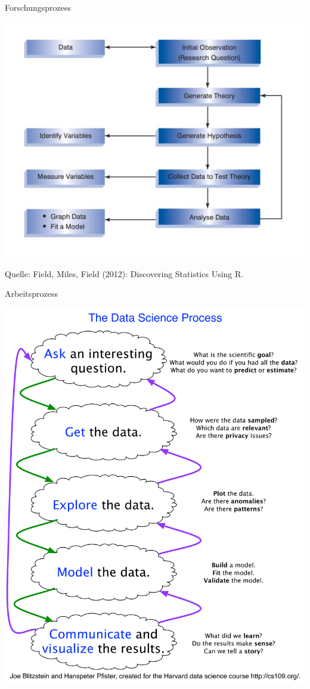 \documentclass[ignorenonframetext,]{beamer}
\begin{document}
\begin{frame}{Forschungsprozess}

\includegraphics{../fig/research_process.png}

\tiny Quelle: Field, Miles, Field (2012): Discovering Statistics Using
R.

\end{frame}

\begin{frame}{Arbeitsprozess}

\includegraphics{../fig/data_science_workflow.png}

\end{frame}
\end{document}
